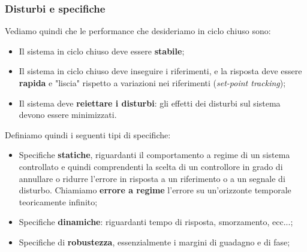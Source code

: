 \documentclass[a4paper,11pt]{article}
\begin{document}
\subsubsection{Disturbi e specifiche}
Vediamo quindi che le performance che desideriamo in ciclo chiuso sono:
\begin{itemize}
	\item Il sistema in ciclo chiuso deve essere \textbf{stabile};
	\item Il sistema in ciclo chiuso deve inseguire i riferimenti, e la risposta deve essere \textbf{rapida} e "liscia" rispetto a variazioni nei riferimenti (\textit{set-point tracking});
	\item Il sistema deve \textbf{reiettare i disturbi}: gli effetti dei disturbi sul sistema devono essere minimizzati.
\end{itemize}

Definiamo quindi i seguenti tipi di specifiche:
\begin{itemize}
	\item Specifiche \textbf{statiche}, riguardanti il comportamento a regime di un sistema controllato e quindi comprendenti la scelta di un controllore in grado di annullare o ridurre l'errore in risposta a un riferimento o a un segnale di disturbo. Chiamiamo \textbf{errore a regime} l'errore su un'orizzonte temporale teoricamente infinito;
	\item Specifiche \textbf{dinamiche}: riguardanti tempo di risposta, smorzamento, ecc...;
	\item Specifiche di \textbf{robustezza}, essenzialmente i margini di guadagno e di fase;
\end{itemize}
\end{document}
